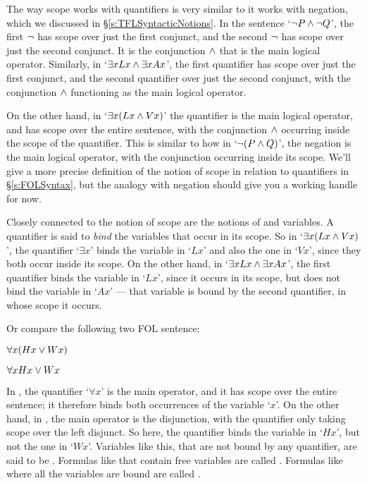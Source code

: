 The way scope works with quantifiers is very similar to it works with negation, which we discussed in \S\ref{s:TFLSyntacticNotions}.   In the sentence `$\neg P \wedge \neg Q$', the first $\neg$ has scope over just the first conjunct, and the second $\neg$ has scope over just the second conjunct.   It is the conjunction $\wedge$ that is the main logical operator.  Similarly, in `$\exists xLx \wedge \exists xAx$', the first quantifier has scope over just the first conjunct, and the second quantifier over just the second conjunct, with the conjunction $\wedge$ functioning as the main logical operator.

On the other hand, in `$\exists x(Lx \wedge Vx)$' the quantifier is the main logical operator, and has scope over the entire sentence, with the conjunction $\wedge$ occurring inside the scope of the quantifier.  This is similar to how in `$\neg (P \wedge Q)$', the negation is the main logical operator, with the conjunction occurring inside its scope.  We'll give a more precise definition of the notion of scope in relation to quantifiers in \S\ref{s:FOLSyntax}, but the analogy with negation should give you a working handle for now.

Closely connected to the notion of scope are the notions of  and  variables.  A quantifier is said to \emph{bind} the variables that occur in its scope.  So in `$\exists x(Lx \wedge Vx)$', the quantifier `$\exists x$' binds the variable in `$Lx$' and also the one in `$Vx$', since they both occur inside its scope.  On the other hand, in `$\exists xLx \wedge \exists xAx$', the first quantifier binds the variable in `$Lx$', since it occurs in its scope, but does not bind the variable in `$Ax$'  --- that variable is bound by the second quantifier, in whose scope it occurs.

Or compare the following two FOL sentence:

	\begin{earg}
		\item[\ex{bound1}] $\forall x(Hx \vee Wx)$
		\item[\ex{bound2}] $\forall xHx \vee Wx$
	\end{earg}
In , the quantifier `$\forall x$' is the main operator, and it has scope over the entire sentence; it therefore binds both occurrences of the variable `$x$'.  On the other hand, in , the main operator is the disjunction, with the quantifier only taking scope over the left disjunct.  So here, the quantifier binds the variable in `$Hx$', but not the one in `$Wx$'.  Variables like this, that are not bound by any quantifier, are said to be .  Formulas like  that contain free variables are called .  Formulas like  where all the variables are bound are called .

